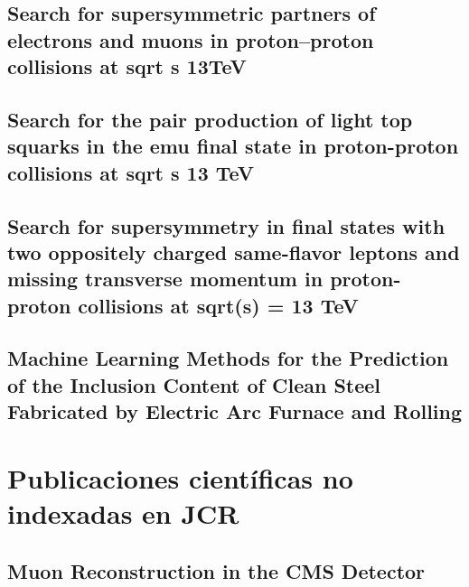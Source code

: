 \documentclass[a4paper, 11pt, twoside, openright]{report}
\begin{document}
\subsection{Search for supersymmetric partners of electrons and muons in proton–proton collisions at sqrt s 13TeV}


\subsection{Search for the pair production of light top squarks in the emu final state in proton-proton collisions at sqrt s 13 TeV}


\subsection{Search for supersymmetry in final states with two oppositely charged same-flavor leptons and missing transverse momentum in proton-proton collisions at sqrt(s) = 13 TeV}


\subsection{Machine Learning Methods for the Prediction of the Inclusion Content of Clean Steel Fabricated by Electric Arc Furnace and Rolling}



\section{Publicaciones científicas no indexadas en JCR}

\subsection{Muon Reconstruction in the CMS Detector}

\end{document}
